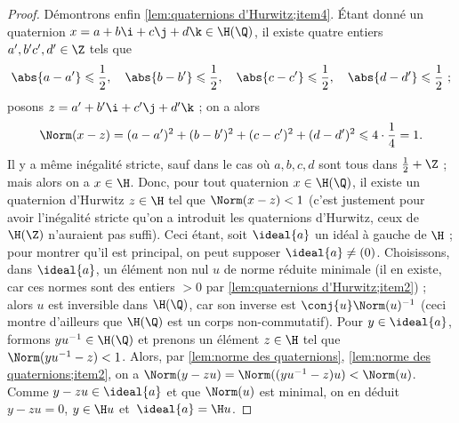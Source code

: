 \documentclass[11pt, %
  title in boldface,
  theorem in new line,
  theorem numbering = section,
  number theorems separately,
  simple name,
]{beaulivre}
\begin{document}
\begin{proof}
        Démontrons enfin \ref{lem:quaternions d'Hurwitz;item4}. Étant donné un quaternion \( x = a+b\i+c\j+d\k \in \H(\Q) \), il existe quatre entiers \( a',b'c',d' \in \Z \) tels que
        \[
            \abs{a-a'} \leqslant \frac{1}{2}, \quad
            \abs{b-b'} \leqslant \frac{1}{2}, \quad
            \abs{c-c'} \leqslant \frac{1}{2}, \quad
            \abs{d-d'} \leqslant \frac{1}{2} ~;
        \]
        posons \( z = a'+b'\i+c'\j+d'\k \) ; on a alors
        \[
            \Norm(x-z) = (a-a')^2 + (b-b')^2 + (c-c')^2 + (d-d')^2 \leqslant 4 \cdot \frac{1}{4} = 1.
        \]
        Il y a même inégalité stricte, sauf dans le cas où \( a,b,c,d \) sont tous dans \( \frac{1}{2} + \Z \) ; mais alors on a \( x \in \H \). Donc, pour tout quaternion \( x \in \H(\Q) \), il existe un quaternion d'Hurwitz \( z \in \H \) tel que \( \Norm(x-z) < 1 \) (c'est justement pour avoir l'inégalité stricte qu'on a introduit les quaternions d'Hurwitz, ceux de \( \H(\Z) \) n'auraient pas suffi). Ceci étant, soit \( \ideal{a} \) un idéal à gauche de \( \H \) ; pour montrer qu'il est principal, on peut supposer \( \ideal{a} \neq (0) \). Choisissons, dans \( \ideal{a} \), un élément non nul \( u \) de norme réduite minimale (il en existe, car ces normes sont des entiers \( > 0 \) par \ref{lem:quaternions d'Hurwitz;item2}) ; alors \( u \) est inversible dans \( \H(\Q) \), car son inverse est \( \conj{u} \Norm(u)^{-1} \) (ceci montre d'ailleurs que \( \H(\Q) \) est un corps non-commutatif). Pour \( y \in \ideal{a} \), formons \( y u^{-1} \in \H(\Q) \) et prenons un élément \( z \in \H \) tel que \( \Norm(yu^{-1}-z) < 1 \). Alors, par \cref{lem:norme des quaternions}, \ref{lem:norme des quaternions;item2}, on a \( \Norm(y-zu) = \Norm((yu^{-1}-z)u) < \Norm(u) \). Comme \( y-zu \in \ideal{a} \) et que \( \Norm(u) \) est minimal, on en déduit \( y-zu = 0 \), \( y \in \H u \) et~\( \ideal{a} = \H u \).
    \end{proof}
\end{document}
